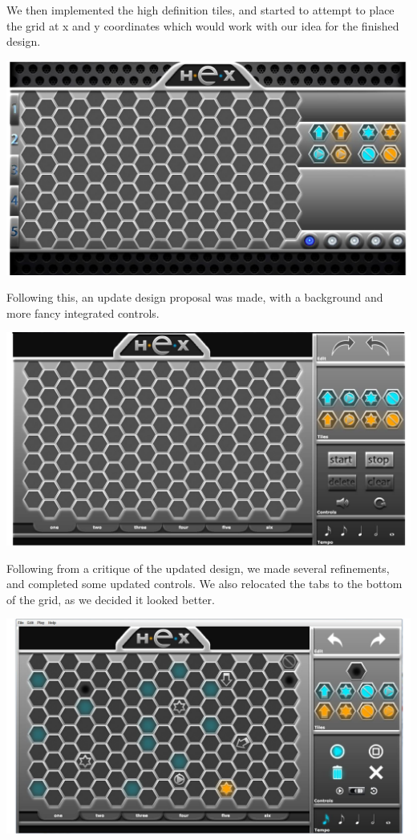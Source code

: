 \documentclass[10pt,a4paper]{article}
\begin{document}
We then implemented the high definition tiles, and started to attempt to place the grid at x and y coordinates which would work with our idea for the finished design.

\begin{center}
\includegraphics[scale=0.45]{logoprogression3.png}
\end{center}

Following this, an update design proposal was made, with a background and more fancy integrated controls.
\\
\begin{center}
\includegraphics[scale=0.45]{logoprogression4.png}
\end{center}

Following from a critique of the updated design, we made several refinements, and completed some updated controls. We also relocated the tabs to the bottom of the grid, as we decided it looked better.
\\
\begin{center}
\includegraphics[scale=0.45]{logoprogression5.png}
\end{center}
\end{document}
